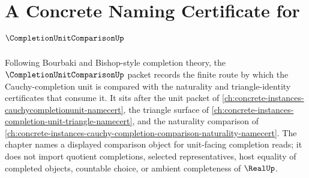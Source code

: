 \chapter{A Concrete Naming Certificate for $\CompletionUnitComparisonUp$}
\label{ch:concrete-instances-completion-unit-comparison-namecert}

Following Bourbaki and Bishop-style completion theory, the $\CompletionUnitComparisonUp$ packet records the finite route by which the Cauchy-completion unit is compared with the naturality and triangle-identity certificates that consume it. It sits after the unit packet of \autoref{ch:concrete-instances-cauchycompletionunit-namecert}, the triangle surface of \autoref{ch:concrete-instances-completion-unit-triangle-namecert}, and the naturality comparison of \autoref{ch:concrete-instances-cauchy-completion-comparison-naturality-namecert}. The chapter names a displayed comparison object for unit-facing completion reads; it does not import quotient completions, selected representatives, host equality of completed objects, countable choice, or ambient completeness of $\RealUp$.

